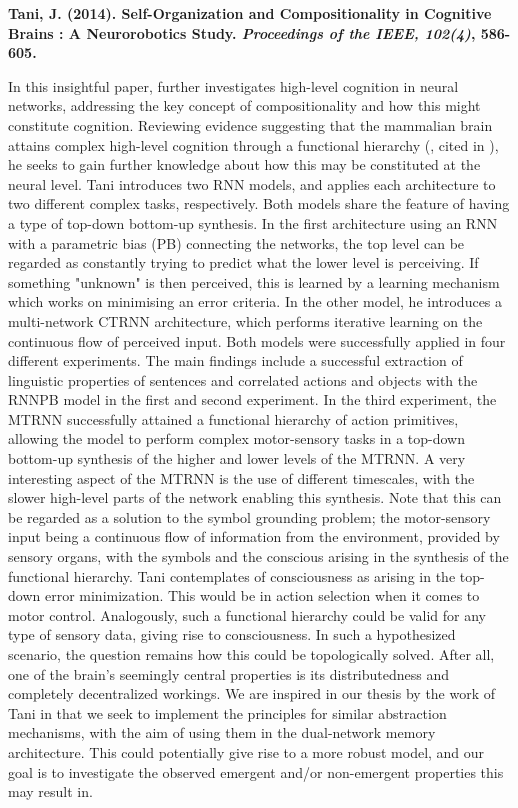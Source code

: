 \textbf{Tani, J. (2014). Self-Organization and Compositionality in Cognitive Brains : A Neurorobotics Study. \textit{Proceedings of the IEEE, 102(4)}, 586-605.}

In this insightful paper, \cite{Tani2014} further investigates high-level cognition in neural networks, addressing the key concept of compositionality and how this might constitute cognition. Reviewing evidence suggesting that the mammalian brain attains complex high-level cognition through a functional hierarchy (\cite{Miyake2000, Koechlin2003, Fuster2008}, cited in \cite{Tani2014}), he seeks to gain further knowledge about how this may be constituted at the neural level. Tani introduces two RNN models, and applies each architecture to two different complex tasks, respectively. Both models share the feature of having a type of top-down bottom-up synthesis. In the first architecture using an RNN with a parametric bias (PB) connecting the networks, the top level can be regarded as constantly trying to predict what the lower level is perceiving. If something "unknown" is then perceived, this is learned by a learning mechanism which works on minimising an error criteria. In the other model, he introduces a multi-network CTRNN architecture, which performs iterative learning on the continuous flow of perceived input. Both models were successfully applied in four different experiments. The main findings include a successful extraction of linguistic properties of sentences and correlated actions and objects with the RNNPB model in the first and second experiment. In the third experiment, the MTRNN successfully attained a functional hierarchy of action primitives, allowing the model to perform complex motor-sensory tasks in a top-down bottom-up synthesis of the higher and lower levels of the MTRNN. A very interesting aspect of the MTRNN is the use of different timescales, with the slower high-level parts of the network enabling this synthesis. Note that this can be regarded as a solution to the symbol grounding problem; the motor-sensory input being a continuous flow of information from the environment, provided by sensory organs, with the symbols and the conscious arising in the synthesis of the functional hierarchy. Tani contemplates of consciousness as arising in the top-down error minimization. This would be in action selection when it comes to motor control. Analogously, such a functional hierarchy could be valid for any type of sensory data, giving rise to consciousness. In such a hypothesized scenario, the question remains how this could be topologically solved. After all, one of the brain's seemingly central properties is its distributedness and completely decentralized workings. We are inspired in our thesis by the work of Tani in that we seek to implement the principles for similar abstraction mechanisms, with the aim of using them in the dual-network memory architecture. This could potentially give rise to a more robust model, and our goal is to investigate the observed emergent and/or non-emergent properties this may result in.


